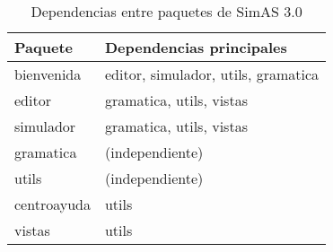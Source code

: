 \begin{table}[H]
\centering
\begin{tabular}{|l|l|}
\hline
\textbf{Paquete} & \textbf{Dependencias principales} \\
\hline
bienvenida & editor, simulador, utils, gramatica \\
\hline
editor & gramatica, utils, vistas \\
\hline
simulador & gramatica, utils, vistas \\
\hline
gramatica & (independiente) \\
\hline
utils & (independiente) \\
\hline
centroayuda & utils \\
\hline
vistas & utils \\
\hline
\end{tabular}
\caption{Dependencias entre paquetes de SimAS 3.0}
\label{tab:dependencias-paquetes}
\end{table}

